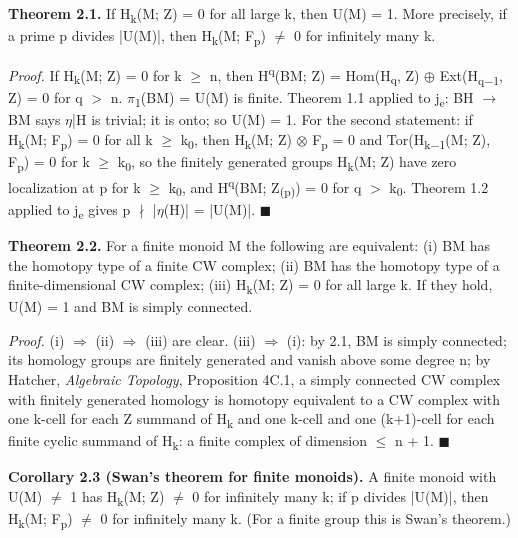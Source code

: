\textbf{Theorem 2.1.} If H\textsubscript{k}(M; Z) = 0 for all large k, then U(M) = 1. More precisely, if a prime p divides |U(M)|, then H\textsubscript{k}(M; F\textsubscript{p}) \ensuremath{\ne} 0 for infinitely many k.

\emph{Proof.} If H\textsubscript{k}(M; Z) = 0 for k \ensuremath{\geq} n, then H\textsuperscript{q}(BM; Z) = Hom(H\textsubscript{q}, Z) \ensuremath{\oplus} Ext(H\textsubscript{q\ensuremath{-}1}, Z) = 0 for q \ensuremath{>} n. \ensuremath{\pi}\textsubscript{1}(BM) = U(M) is finite. Theorem 1.1 applied to j\textsubscript{e}: BH \ensuremath{\to} BM says \ensuremath{\eta}|H is trivial; it is onto; so U(M) = 1. For the second statement: if H\textsubscript{k}(M; F\textsubscript{p}) = 0 for all k \ensuremath{\geq} k\textsubscript{0}, then H\textsubscript{k}(M; Z) \ensuremath{\otimes} F\textsubscript{p} = 0 and Tor(H\textsubscript{k\ensuremath{-}1}(M; Z), F\textsubscript{p}) = 0 for k \ensuremath{\geq} k\textsubscript{0}, so the finitely generated groups H\textsubscript{k}(M; Z) have zero localization at p for k \ensuremath{\geq} k\textsubscript{0}, and H\textsuperscript{q}(BM; Z\textsubscript{(p)}) = 0 for q \ensuremath{>} k\textsubscript{0}. Theorem 1.2 applied to j\textsubscript{e} gives p \ensuremath{\nmid} |\ensuremath{\eta}(H)| = |U(M)|. \ensuremath{\blacksquare}

\textbf{Theorem 2.2.} For a finite monoid M the following are equivalent: (i) BM has the homotopy type of a finite CW complex; (ii) BM has the homotopy type of a finite-dimensional CW complex; (iii) H\textsubscript{k}(M; Z) = 0 for all large k. If they hold, U(M) = 1 and BM is simply connected.

\emph{Proof.} (i) \ensuremath{\Rightarrow} (ii) \ensuremath{\Rightarrow} (iii) are clear. (iii) \ensuremath{\Rightarrow} (i): by 2.1, BM is simply connected; its homology groups are finitely generated and vanish above some degree n; by Hatcher, \emph{Algebraic Topology}, Proposition 4C.1, a simply connected CW complex with finitely generated homology is homotopy equivalent to a CW complex with one k-cell for each Z summand of H\textsubscript{k} and one k-cell and one (k+1)-cell for each finite cyclic summand of H\textsubscript{k}: a finite complex of dimension \ensuremath{\leq} n + 1. \ensuremath{\blacksquare}

\textbf{Corollary 2.3 (Swan's theorem for finite monoids).} A finite monoid with U(M) \ensuremath{\ne} 1 has H\textsubscript{k}(M; Z) \ensuremath{\ne} 0 for infinitely many k; if p divides |U(M)|, then H\textsubscript{k}(M; F\textsubscript{p}) \ensuremath{\ne} 0 for infinitely many k. (For a finite group this is Swan's theorem.)

